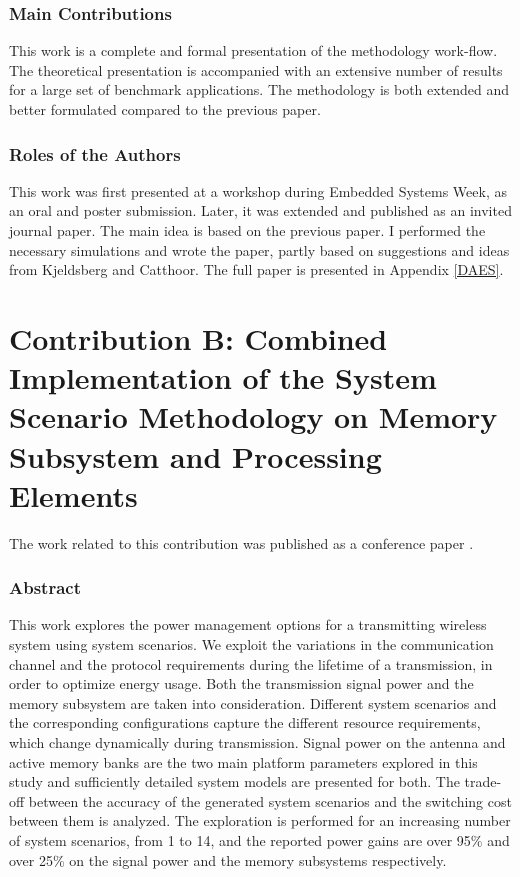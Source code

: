 \subsubsection{Main Contributions}

This work is a complete and formal presentation of the methodology work-flow.
The theoretical presentation is accompanied with an extensive number of results for a large set of benchmark applications.
The methodology is both extended and better formulated compared to the previous paper.

\subsubsection{Roles of the Authors}

This work was first presented at a workshop during Embedded Systems Week, as an oral and poster submission.
Later, it was extended and published as an invited journal paper.
The main idea is based on the previous paper.
I performed the necessary simulations and wrote the paper, partly based on suggestions and ideas from Kjeldsberg and Catthoor. 
The full paper is presented in Appendix \ref{DAES}.

\section{Contribution B: Combined Implementation of the System Scenario Methodology on Memory Subsystem and Processing Elements}

The work related to this contribution was published as a conference paper \cite{zompakis2014systematic}.

\subsubsection{Abstract}

This work explores the power management options for a transmitting wireless system using system scenarios. We exploit the variations in the communication channel and the protocol requirements during the lifetime of a transmission, in order to optimize energy usage. Both the transmission signal power and the memory subsystem are taken into consideration. Different system scenarios and the corresponding configurations capture the different resource requirements, which change dynamically during transmission. Signal power on the antenna and active memory banks are the two main platform parameters explored in this study and sufficiently detailed system models are presented for both. The trade-off between the accuracy of the generated system scenarios and the switching cost between them is analyzed. The exploration is performed for an increasing number of system scenarios, from 1 to 14, and the reported power gains are over 95\% and over 25\% on the signal power and the memory subsystems respectively.

